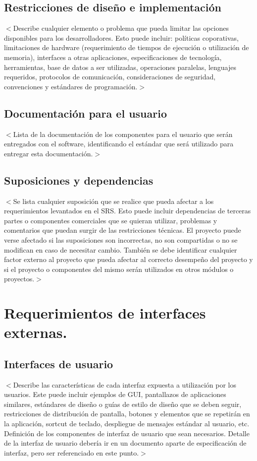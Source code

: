 \documentclass{scrreprt}
\begin{document}
\section{Restricciones de diseño e implementación}
$<$Describe cualquier elemento o problema que pueda limitar las opciones disponibles para los desarrolladores. Esto puede incluir: políticas coporativas, limitaciones de hardware (requerimiento de tiempos de ejecución o utilización de memoria), interfaces a otras aplicaciones, especificaciones de tecnología, herramientas, base de datos a ser utilizadas, operaciones paralelas, lenguajes requeridos, protocolos de comunicación, consideraciones de seguridad, convenciones y estándares de programación.$>$

\section{Documentación para el usuario}
$<$Lista de la documentación de los componentes para el usuario que serán entregados con el software, identificando el estándar que será utilizado para entregar esta documentación.$>$
\section{Suposiciones y dependencias}
$<$Se lista cualquier suposición que se realice que pueda afectar a los requerimientos levantados en el SRS. Esto puede incluir dependencias de terceras partes o componentes comerciales que se quieran utilizar, problemas y comentarios que puedan surgir de las restricciones técnicas. El proyecto puede verse afectado si las suposiciones son incorrectas, no son compartidas o no se modifican en caso de necesitar cambio. También se debe identificar cualquier factor externo al proyecto que pueda afectar al correcto desempeño del proyecto y si el proyecto o componentes del mismo serán utilizados en otros módulos o proyectos.$>$

\chapter{Requerimientos de interfaces externas.}

\section{Interfaces de usuario}
$<$Describe las características de cada interfaz expuesta a utilización por los usuarios. Este puede incluir ejemplos de GUI, pantallazos de aplicaciones similares, estándares de diseño o guías de estilo de diseño que se deben seguir, restricciones de distribución de pantalla, botones y elementos que se repetirán en la aplicación, sortcut de teclado, despliegue de mensajes estándar al usuario, etc. Definición de los componentes de interfaz de usuario que sean necesarios. Detalle de la interfaz de usuario debería ir en un documento aparte de especificación de interfaz, pero ser referenciado en este punto.$>$
\end{document}
